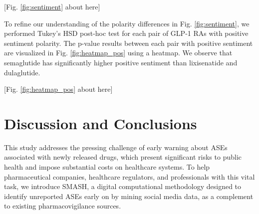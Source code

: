 \documentclass[referee,bst/sn-basic]{sn-jnl}%
\theoremstyle{thmstyletwo}%
\theoremstyle{thmstylethree}%
\begin{document}
\begin{center}
    [Fig. \ref{fig:sentiment} about here]
\end{center}

\begin{comment}
 \begin{figure}[H]
    \centering
    \texttt{[image: images/tukey\_hsd\_plot\_Twitter.pdf]}
    \caption{Sentiment analysis violin plots of positive and negative polarity groups for $\mathbb{X}$ posts with combined generic and brand names of GLP-1 RAs.
    }
    \label{fig:sentiment}
\end{figure}
\end{comment}

To refine our understanding of the polarity differences in Fig. \ref{fig:sentiment}, we performed Tukey's HSD post-hoc test for each pair of GLP-1 RAs with positive sentiment polarity. 
The p-value results between each pair with positive sentiment are visualized in Fig. \ref{fig:heatmap_pos} using a heatmap.
We observe that semaglutide has significantly higher positive sentiment than lixisenatide and dulaglutide.

\begin{center}
    [Fig. \ref{fig:heatmap_pos} about here]
\end{center}


\begin{comment}
 \begin{figure}[H]
    \centering
    \texttt{[image: images/tukey\_hearmap\_positive\_x.pdf]}
    \caption{Heatmap visualizing the p-value results of Tukey’s HSD post-hoc test.}
    \label{fig:heatmap_pos}
\end{figure}
\end{comment}

\section{Discussion and Conclusions}
\label{sec:discussion}
This study addresses the pressing challenge of early warning about ASEs associated with newly released drugs, which present significant risks to public health and impose substantial costs on healthcare systems. 
To help pharmaceutical companies, healthcare regulators, and professionals with this vital task, we introduce SMASH, a digital computational methodology designed to identify unreported ASEs early on by mining social media data, as a complement to existing pharmacovigilance sources. 
\end{document}
